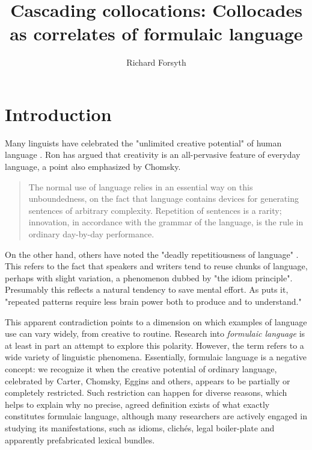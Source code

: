 \documentclass[output=paper]{langscibook}
\author{Richard Forsyth\affiliation{%
}\orcid{}}
\title{Cascading collocations: Collocades as correlates of formulaic language}
\begin{document}
\lstset{frame=lines}
\maketitle

\section{Introduction}

Many linguists have celebrated the "unlimited creative potential" of human language \citep[117]{Eggins1994}. Ron \citet{Carter2004} has argued that creativity is an all-pervasive feature of everyday language, a point also emphasized by Chomsky.

\begin{quote}
The normal use of language relies in an essential way on this unboundedness, on the fact that language contains devices for generating sentences of arbitrary complexity. Repetition of sentences is a rarity; innovation, in accordance with the grammar of the language, is the rule in ordinary day-by-day performance.\hfill\citep[118]{Chomsky1972}\hbox{}
\end{quote}

On the other hand, others have noted the "deadly repetitiousness of language" \citep[570]{Bolinger1965}. This refers to the fact that speakers and writers tend to reuse chunks of language, perhaps with slight variation, a phenomenon dubbed by \citet{Sinclair1991} "the idiom principle". Presumably this reflects a natural tendency to save mental effort. As \citet{Halliday2014} puts it, "repeated patterns require less brain power both to produce and to understand."

This apparent contradiction points to a dimension on which examples of language use can vary widely, from creative to routine. Research into \textit{formulaic language} is at least in part an attempt to explore this polarity. However, the term refers to a wide variety of linguistic phenomena. Essentially, formulaic language is a negative concept: we recognize it when the creative potential of ordinary language, celebrated by Carter, Chomsky, Eggins and others, appears to be partially or completely restricted. Such restriction can happen for diverse reasons, which helps to explain why no precise, agreed definition exists of what exactly constitutes formulaic language, although many researchers are actively engaged in studying its manifestations, such as idioms, clichés, legal boiler-plate and apparently prefabricated lexical bundles.
\end{document}
